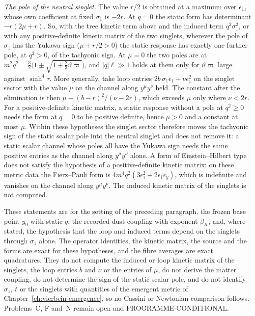 \emph{The pole of the neutral singlet.} The value \(r/2\) is obtained at a maximum over \(\epsilon_1\), whose own coefficient at fixed \(\sigma_1\) is \(-2r\). At \(q=0\) the static form has determinant \(-r(2\mu+r)\). So, with the tree kinetic term above and the induced term \(q^2\sigma_1^2\), or with any positive-definite kinetic matrix of the two singlets, wherever the pole of \(\sigma_1\) has the Yukawa sign (\(\mu+r/2>0\)) the static response has exactly one further pole, at \(q^2>0\), of the tachyonic sign. At \(\mu=0\) the two poles are at \(m^2q^2=\tfrac32\bigl(1\pm\sqrt{1+\tfrac23\vartheta\varpi}\bigr)\), and \(|q|\ell\gg1\) holds at them only for \(\vartheta\varpi\) large against \(\sinh^4\tau\). More generally, take loop entries \(2b\,\sigma_1\epsilon_1+\nu\epsilon_1^2\) on the singlet sector with the value \(\mu\) on the channel along \(y^\mu y^\nu\) held. The constant after the elimination is then \(\mu-(b-r)^2/(\nu-2r)\), which exceeds \(\mu\) only where \(\nu<2r\). For a positive-definite kinetic matrix, a static response without a pole at \(q^2\ge0\) needs the form at \(q=0\) to be positive definite, hence \(\mu>0\) and a constant at most \(\mu\). Within these hypotheses the singlet sector therefore moves the tachyonic sign of the static scalar pole into the neutral singlet and does not remove it: a static scalar channel whose poles all have the Yukawa sign needs the same positive entries as the channel along \(y^\mu y^\nu\) alone. A form of Einstein--Hilbert type does not satisfy the hypothesis of a positive-definite kinetic matrix: on these metric data the Fierz--Pauli form is \(4m^4q^2(3\epsilon_1^2+2\epsilon_1\epsilon_y)\), which is indefinite and vanishes on the channel along \(y^\mu y^\nu\). The induced kinetic matrix of the singlets is not computed.

These statements are for the setting of the preceding paragraph, the frozen base point \(y_0\) with static \(q\), the recorded dust coupling with exponent \(\beta_K\), and, where stated, the hypothesis that the loop and induced terms depend on the singlets through \(\sigma_1\) alone. The operator identities, the kinetic matrix, the source and the forms are exact for these hypotheses, and the fibre averages are exact quadratures. They do not compute the induced or loop kinetic matrix of the singlets, the loop entries \(b\) and \(\nu\) or the entries of \(\mu\), do not derive the matter coupling, do not determine the sign of the static scalar pole, and do not identify \(\sigma_1\), \(t\) or the singlets with quantities of the emergent metric of Chapter~\ref{ch:vierbein-emergence}, so no Cassini or Newtonian comparison follows. Problems~C, F and~N remain open and PROGRAMME-CONDITIONAL.

